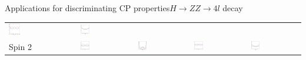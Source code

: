 \documentclass[usenames,dvipsnames,svgnames,table]{beamer}
\begin{document}
\begin{frame}{Applications for discriminating CP properties}{$H\to ZZ\to 4l$ decay}
\begin{tabular}{m{}m{}m{}m{}m{}}
\noindent\includegraphics[width=0.18\textwidth]{onthespinandparity/phistar1_125GeV_spin1} &
\noindent\includegraphics[width=0.18\textwidth]{onthespinandparity/costheta1_125GeV_spin1} \\
\footnotesize\centering Spin 2 &
\noindent\includegraphics[width=0.18\textwidth]{onthespinandparity/phi_125GeV_spin2} &
\noindent\includegraphics[width=0.18\textwidth]{onthespinandparity/costhetastar_125GeV_spin2}&
\noindent\includegraphics[width=0.18\textwidth]{onthespinandparity/phistar1_125GeV_spin2} &
\noindent\includegraphics[width=0.18\textwidth]{onthespinandparity/costheta1_125GeV_spin2}
\end{tabular}
\end{frame}
\end{document}

